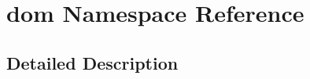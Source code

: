 \hypertarget{namespacedom}{\section{dom Namespace Reference}
\label{namespacedom}
}


\subsection{Detailed Description}
